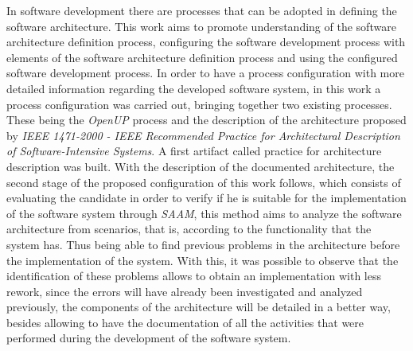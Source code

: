 In software development there are processes that can be adopted in defining the software architecture. This work aims to promote understanding of the software architecture definition process, configuring the software development process with elements of the software architecture definition process and using the configured software development process. In order to have a process configuration with more detailed information regarding the developed software system, in this work a process configuration was carried out, bringing together two existing processes. 
These being the \emph{\acrfull{OpenUP}} process and the description of the architecture proposed by \emph{IEEE 1471-2000 - IEEE Recommended Practice for Architectural Description of Software-Intensive Systems}. 
A first artifact called practice for architecture description was built. With the description of the documented architecture, the second stage of the proposed configuration of this work follows, which consists of evaluating the candidate in order to verify if he is suitable for the implementation of the software system through 
\emph{\acrfull{SAAM}}, this method aims to analyze the software architecture from scenarios, that is, according to the functionality that the system has. Thus being able to find previous problems in the architecture before the implementation of the system. With this, it was possible to observe that the identification of these problems allows to obtain an implementation with less rework, since the errors will have already been investigated and analyzed previously, the components of the architecture will be detailed in a better way, besides allowing to have the documentation of all the activities that were performed during the development of the software system.